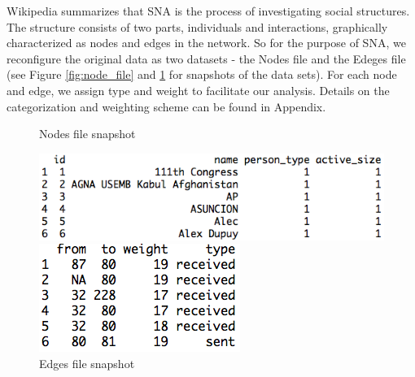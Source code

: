 Wikipedia summarizes that SNA  is the process of investigating social structures\cite{wiki_sna}. The structure consists of two parts, individuals and interactions, graphically characterized as nodes and edges in the network. So for the purpose of SNA, we reconfigure the original data as two datasets - the Nodes file and the Edeges file (see Figure \ref{fig:node_file} and \ref{fig:edge_file} for snapshots of the data sets). For each node and edge, we assign type and weight to facilitate our analysis. Details on the categorization and weighting scheme can be found in Appendix.
\begin{figure}[ht]
\caption{Nodes file snapshot}
\label{fig:node_file}
\centering
\includegraphics[width=.68\textwidth]{report_node_file}

\caption{Edges file snapshot}
\label{fig:edge_file}
\centering
\includegraphics[width=.35\textwidth]{report_edge_file}
\end{figure}
